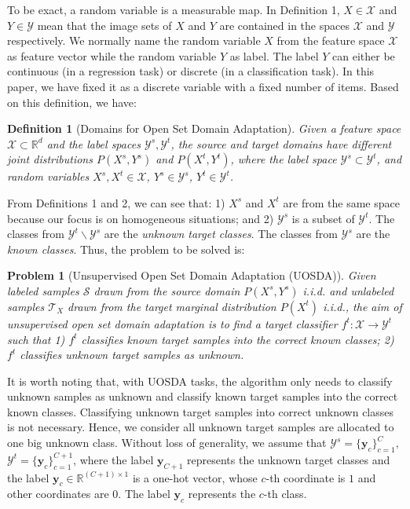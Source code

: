 \documentclass[journal]{IEEEtran}
\newtheorem{Definition}{Definition}
\newtheorem{definition*}{Problem}
\begin{document}
To be exact, a random variable is a measurable map. In Definition 1, $X\in \mathcal{X}$ and  $Y \in \mathcal{Y}$ mean that the image sets of $X$ and $Y$ are contained in the spaces $\mathcal{X}$ and $\mathcal{Y}$ respectively.
We normally name the random variable $X$ from the feature space $\mathcal{X}$ as feature vector while the random variable $Y$ as label. The label $Y$ can either be continuous (in a regression task) or discrete (in a classification task). In this paper, we have fixed it as a discrete variable with a fixed number of items. Based on this definition, we have:
\begin{Definition}[{Domains for Open Set Domain Adaptation}]\label{d3}Given a feature space $\mathcal{X}\subset \mathbb{R}^d$ and the label spaces $\mathcal{Y}^s, \mathcal{Y}^t$, the {source} and {target domains} have different joint distributions $P(X^s, Y^s)$ and $P(X^t, Y^t)$, where the label space $\mathcal{Y}^s \subset \mathcal{Y}^t$, and  random variables $X^s, X^t \in \mathcal{X}$, $Y^s \in \mathcal{Y}^s$, $Y^t \in \mathcal{Y}^t$.
\end{Definition}

From Definitions 1 and 2, we can see that: 1) $X^s$ and $X^t$ are from the same space because our focus is on homogeneous situations; and 2) $\mathcal{Y}^s$ is a subset of $\mathcal{Y}^t$. The classes from $\mathcal{Y}^t \backslash \mathcal{Y}^s$ are the \textit{{unknown target classes}}.  The classes from $\mathcal{Y}^s$ are the \textit{{known classes}}. Thus, the problem to be solved is:

\begin{definition*}[{Unsupervised Open Set Domain Adaptation (UOSDA)}]
Given labeled samples $\mathcal{S}$ drawn from the source domain $P(X^s, Y^s)$ i.i.d. and unlabeled samples $\mathcal{T}_X$ drawn from the target marginal distribution $P(X^t)$ i.i.d., {the aim of unsupervised open set domain adaptation} is to find a target classifier  $f^t:\mathcal{X}\rightarrow \mathcal{Y}^{t}$ such that
\newline
\noindent\textit{1)} $f^t$ \textit{classifies known target samples into the correct known classes;}\newline
\noindent\textit{2)} $f^t$ \textit{classifies unknown target samples as unknown.
}
\end{definition*}

It is worth noting that, with UOSDA tasks, the algorithm only needs to classify unknown samples as unknown and classify known target samples into the correct known classes. Classifying unknown target samples into correct unknown classes is not necessary. Hence, we consider all unknown target samples are allocated to one big unknown class.  {Without loss of generality, we assume that
$\mathcal{Y}^s=\{{\mathbf{y}}_c\}_{c=1}^C,$ $\mathcal{Y}^t=\{{\mathbf{y}}_c\}_{c=1}^{C+1}$, where the label ${\mathbf{y}}_{C+1}$ represents the unknown target classes and the label ${\mathbf{y}}_c\in \mathbb{R}^{{(C+1)}\times 1}$ is a one-hot vector, whose $c$-th coordinate is $1$ and other coordinates are $0$. The label ${\mathbf{y}}_c$ represents the $c$-th class.}
\end{document}
